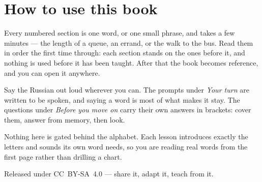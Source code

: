 \documentclass[11pt,twoside]{book}
\begin{document}
\section*{How to use this book}

Every numbered section is one word, or one small phrase, and takes a few
minutes --- the length of a queue, an errand, or the walk to the bus. Read them
in order the first time through: each section stands on the ones before it, and
nothing is used before it has been taught. After that the book becomes
reference, and you can open it anywhere.

Say the Russian out loud wherever you can. The prompts under \emph{Your turn}
are written to be spoken, and saying a word is most of what makes it stay. The
questions under \emph{Before you move on} carry their own answers in brackets:
cover them, answer from memory, then look.

Nothing here is gated behind the alphabet. Each lesson introduces exactly the
letters and sounds its own word needs, so you are reading real words from the
first page rather than drilling a chart.

Released under CC~BY-SA~4.0 --- share it, adapt it, teach from it.

\tableofcontents

\mainmatter


\end{document}
